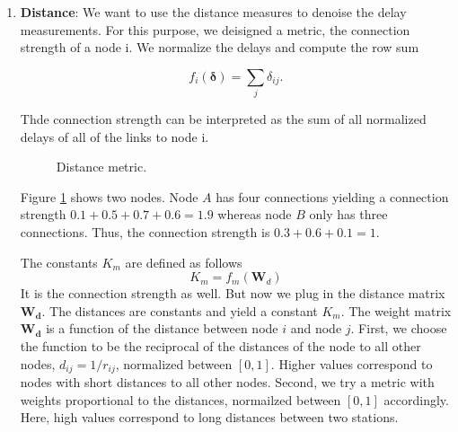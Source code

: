 \documentclass[12pt,a4paper,english]{article}
\begin{document}
\begin{enumerate}
\item \textbf{Distance}: We want to use the distance measures to denoise the delay measurements. For this purpose, we deisigned a metric, the connection strength of a node i. We normalize the delays and compute the row sum 

\begin{equation}
f_i (\bm{\delta})= \sum_j{\delta_{ij}}.  
\end{equation}

Thde connection strength can be interpreted as the sum of all normalized delays of all of the links to node i.

\begin{figure}[htb]
\centering
{}
\caption{Distance metric.} \label{fig:1}
\end{figure}
Figure \ref{fig:1} shows two nodes. Node $A$ has four connections yielding a connection strength $0.1+0.5+0.7+0.6=1.9$ whereas node $B$ only has three connections. Thus, the connection strength is $0.3+0.6+0.1=1$.



The constants $K_m$ are defined as follows
\begin{equation}
K_m=f_m(\bm W_d)
\end{equation}
It is the connection strength as well. But now we plug in the distance matrix $\bm{W_d}$. The distances are constants and yield a constant $K_m$.
The weight matrix $\bm{W_d}$ is a function of the distance between node $i$ and node $j$. First, we choose the function to be the reciprocal of the distances of the node to all other nodes, $d _{ij}= 1/r_{ij}$, normalized between $[0,1]$. Higher values correspond to nodes with short distances to all other nodes. Second, we try a metric with weights proportional to the distances, normailzed between $[0,1]$ accordingly. Here, high values correspond to long distances between two stations.


\end{enumerate}
\end{document}
